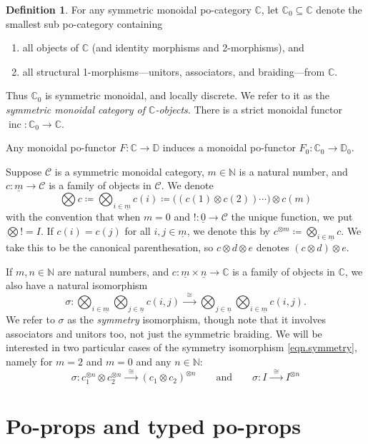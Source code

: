 \documentclass[11pt, oneside, article]{memoir}
\theoremstyle{plain}
\theoremstyle{definition}
\newtheorem{definition}[theorem]{Definition}
\theoremstyle{remark}
\newcommand{\ord}[1]{\underline{#1}}%
\newcommand{\cat}[1]{\mathcal{#1}}%
\DeclareMathOperator{\inc}{inc}
\newcommand{\tpow}[1]{^{\otimes #1}}
\newcommand{\cc}{\mathbb{C}}
\newcommand{\dd}{\mathbb{D}}
\newcommand{\nn}{\mathbb{N}}
\newcommand{\mob}[1]{#1_0}
\newcommand{\To}[1]{\xrightarrow{#1}}
\newcommand{\Too}[1]{\To{\;\;#1\;\;}}
\renewcommand{\ss}{\subseteq}
\newcommand{\qqand}{\qquad\text{and}\qquad}
\begin{document}
\begin{definition}\label{def.mob}
For any symmetric monoidal po-category $\cc$, let $\mob{\cc}\ss\cc$ denote the smallest sub po-category containing
\begin{enumerate}
	\item all objects of $\cc$ (and identity morphisms and 2-morphisms), and
	\item all structural 1-morphisms---unitors, associators, and braiding---from $\cc$.
\end{enumerate}
Thus $\mob{\cc}$ is symmetric monoidal, and locally discrete. We refer to it as the \emph{symmetric monoidal category of $\cc$-objects}. There is a strict monoidal functor $\inc\colon\mob{\cc}\to\cc$. 

Any monoidal po-functor $F\colon\cc\to\dd$ induces a monoidal po-functor $\mob{F}\colon\mob{\cc}\to\mob{\dd}$.
\end{definition}

Suppose $\cat{C}$ is a symmetric monoidal category, $m\in\nn$ is a natural number, and $c\colon\ord{m}\to\cat{C}$ is a family of objects in $\cat{C}$. We denote
\[
  \bigotimes c\coloneqq\bigotimes_{i\in\ord{m}}c(i)\coloneqq
  \big((c(1)\otimes c(2))\cdots\big)\otimes c(m)
\]
with the convention that when $m=0$ and $!\colon\ord{0}\to \cat{C}$ the unique function, we put $\bigotimes != I$. If $c(i)=c(j)$ for all $i,j\in\ord{m}$, we denote this by $c\tpow{m}\coloneqq\bigotimes_{i\in\ord{m}}c$. We take this to be the canonical parenthesation, so $c\otimes d\otimes e$ denotes $(c\otimes d)\otimes e$.

If $m,n\in\nn$ are natural numbers, and $c\colon \ord{m}\times \ord{n}\to\cc$ is a family of objects in $\cc$, we also have a natural isomorphism
\begin{equation}\label{eqn.symmetry}
\sigma\colon
\bigotimes_{i\in\ord{m}}\bigotimes_{j\in\ord{n}}c(i,j)\Too{\cong}
\bigotimes_{j\in\ord{n}}\bigotimes_{i\in\ord{m}}c(i,j).
\end{equation}
We refer to $\sigma$ as the \emph{symmetry} isomorphism, though note that it involves associators and unitors too, not just the symmetric braiding. We will be interested in two particular cases of the symmetry isomorphism \cref{eqn.symmetry}, namely for $m=2$ and $m=0$ and any $n\in\nn$:
\[\sigma\colon c_1\tpow{n}\otimes c_2\tpow{n}\Too{\cong}(c_1\otimes c_2)\tpow{n}
\qqand
\sigma\colon I\Too{\cong} I\tpow{n}
\]

\section{Po-props and typed po-props}
\end{document}

